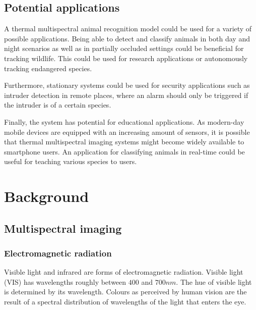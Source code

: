 \documentclass{l4proj}
\begin{document}

\section{Potential applications}

A thermal multispectral animal recognition model could be used for a variety of possible applications. Being able to detect and classify animals in both day and night scenarios as well as in partially occluded settings could be beneficial for tracking wildlife. This could be used for research applications or autonomously tracking endangered species.

Furthermore, stationary systems could be used for security applications such as intruder detection in remote places, where an alarm should only be triggered if the intruder is of a certain species. 

Finally, the system has potential for educational applications. As modern-day mobile devices are equipped with an increasing amount of sensors, it is possible that thermal multispectral imaging systems might become widely available to smartphone users. An application for classifying animals in real-time could be useful for teaching various species to users.

\chapter{Background}
\label{background}

\section{Multispectral imaging}
\label{imaging}

\subsection{Electromagnetic radiation}

Visible light and infrared are forms of electromagnetic radiation. Visible light (VIS) has wavelengths roughly between $400$ and $700 nm$. The hue of visible light is determined by its wavelength. Colours as perceived by human vision are the result of a spectral distribution of wavelengths of the light that enters the eye. 
\end{document}
